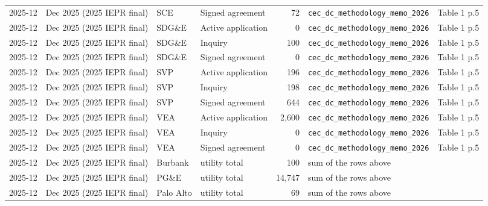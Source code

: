 \begin{tabular}{lp{3.2cm}lp{3.4cm}rp{4.2cm}p{5cm}}
2025-12 & Dec 2025 (2025 IEPR final) & SCE & Signed agreement & 72 & \texttt{cec\_\allowbreak{}dc\_\allowbreak{}methodology\_\allowbreak{}memo\_\allowbreak{}2026} & Table 1 p.5 \\
2025-12 & Dec 2025 (2025 IEPR final) & SDG\&E & Active application & 0 & \texttt{cec\_\allowbreak{}dc\_\allowbreak{}methodology\_\allowbreak{}memo\_\allowbreak{}2026} & Table 1 p.5 \\
2025-12 & Dec 2025 (2025 IEPR final) & SDG\&E & Inquiry & 100 & \texttt{cec\_\allowbreak{}dc\_\allowbreak{}methodology\_\allowbreak{}memo\_\allowbreak{}2026} & Table 1 p.5 \\
2025-12 & Dec 2025 (2025 IEPR final) & SDG\&E & Signed agreement & 0 & \texttt{cec\_\allowbreak{}dc\_\allowbreak{}methodology\_\allowbreak{}memo\_\allowbreak{}2026} & Table 1 p.5 \\
2025-12 & Dec 2025 (2025 IEPR final) & SVP & Active application & 196 & \texttt{cec\_\allowbreak{}dc\_\allowbreak{}methodology\_\allowbreak{}memo\_\allowbreak{}2026} & Table 1 p.5 \\
2025-12 & Dec 2025 (2025 IEPR final) & SVP & Inquiry & 198 & \texttt{cec\_\allowbreak{}dc\_\allowbreak{}methodology\_\allowbreak{}memo\_\allowbreak{}2026} & Table 1 p.5 \\
2025-12 & Dec 2025 (2025 IEPR final) & SVP & Signed agreement & 644 & \texttt{cec\_\allowbreak{}dc\_\allowbreak{}methodology\_\allowbreak{}memo\_\allowbreak{}2026} & Table 1 p.5 \\
2025-12 & Dec 2025 (2025 IEPR final) & VEA & Active application & 2,600 & \texttt{cec\_\allowbreak{}dc\_\allowbreak{}methodology\_\allowbreak{}memo\_\allowbreak{}2026} & Table 1 p.5 \\
2025-12 & Dec 2025 (2025 IEPR final) & VEA & Inquiry & 0 & \texttt{cec\_\allowbreak{}dc\_\allowbreak{}methodology\_\allowbreak{}memo\_\allowbreak{}2026} & Table 1 p.5 \\
2025-12 & Dec 2025 (2025 IEPR final) & VEA & Signed agreement & 0 & \texttt{cec\_\allowbreak{}dc\_\allowbreak{}methodology\_\allowbreak{}memo\_\allowbreak{}2026} & Table 1 p.5 \\
2025-12 & Dec 2025 (2025 IEPR final) & Burbank & utility total & 100 & sum of the rows above & \\
2025-12 & Dec 2025 (2025 IEPR final) & PG\&E & utility total & 14,747 & sum of the rows above & \\
2025-12 & Dec 2025 (2025 IEPR final) & Palo Alto & utility total & 69 & sum of the rows above & \\

\end{tabular}
